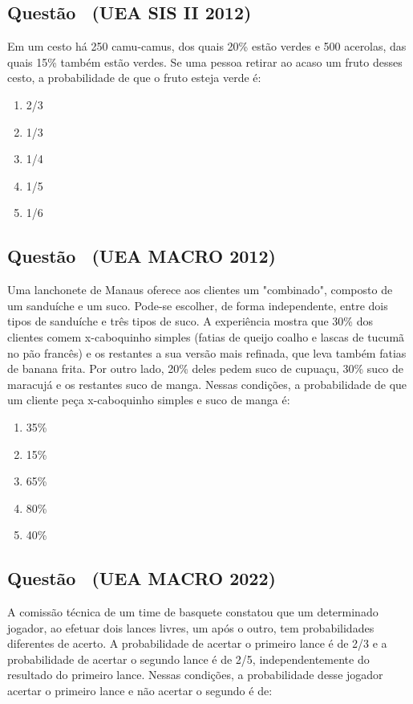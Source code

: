 \documentclass[12pt]{article}
\newcounter{questao}
\newcommand{\novaquestao}[1]{%
  \stepcounter{questao}%
  \subsection*{Questão \thequestao\ (#1)}%
}
\begin{document}
\begin{multicols}{2}
        \novaquestao{UEA SIS II 2012}

            Em um cesto há 250 camu-camus, dos quais 20\% estão verdes
            e 500 acerolas, das quais 15\% também estão verdes. Se uma pessoa
            retirar ao acaso um fruto desses cesto, a probabilidade de que o 
            fruto esteja verde é:

            \begin{enumerate}[label=(\alph*), noitemsep]
                \item {2}/{3}
                \item {1}/{3}
                \item {1}/{4}
                \item {1}/{5}  
                \item {1}/{6} %
            \end{enumerate}

        \novaquestao{UEA MACRO 2012}

            Uma lanchonete de Manaus oferece aos clientes um "combinado",
            composto de um sanduíche e um suco. Pode-se escolher, de forma independente,
            entre dois tipos de sanduíche e três tipos de suco. A experiência
            mostra que 30\% dos clientes comem x-caboquinho simples (fatias de queijo
            coalho e lascas de tucumã no pão francês) e os restantes a sua versão
            mais refinada, que leva também fatias de banana frita. Por outro lado,
            20\% deles pedem suco de cupuaçu, 30\% suco de maracujá e os restantes suco
            de manga. Nessas condições, a probabilidade de que um cliente peça 
            x-caboquinho simples e suco de manga é:

            \begin{enumerate}[label=(\alph*), noitemsep]
                \item 35\%
                \item 15\% %
                \item 65\%
                \item 80\%  
                \item 40\%
            \end{enumerate}

        \novaquestao{UEA MACRO 2022}

            A comissão técnica de um time de basquete constatou que um
            determinado jogador, ao efetuar dois lances livres, um após o outro,
            tem probabilidades diferentes de acerto. A probabilidade de acertar
            o primeiro lance é de {2}/{3} e a probabilidade de acertar o segundo lance
            é de {2}/{5}, independentemente do resultado do primeiro lance. Nessas
            condições, a probabilidade desse jogador acertar o primeiro lance e 
            não acertar o segundo é de:


\end{multicols}
\end{document}
